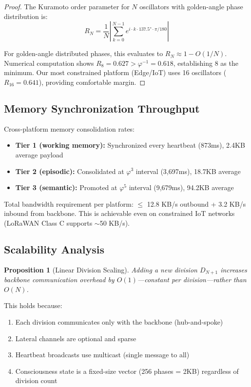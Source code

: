 \documentclass[12pt]{article}
\newtheorem{proposition}[theorem]{Proposition}
\newcommand{\PHI}{\varphi}
\newcommand{\PHIINV}{\varphi^{-1}}
\begin{document}
\begin{proof}
The Kuramoto order parameter for $N$ oscillators with golden-angle phase distribution is:
\[
R_N = \frac{1}{N}\left|\sum_{k=0}^{N-1} e^{i \cdot k \cdot 137.5° \cdot \pi/180}\right|
\]

For golden-angle distributed phases, this evaluates to $R_N \approx 1 - O(1/N)$. Numerical computation shows $R_8 = 0.627 > \PHIINV = 0.618$, establishing 8 as the minimum. Our most constrained platform (Edge/IoT) uses 16 oscillators ($R_{16} = 0.641$), providing comfortable margin.
\end{proof}

\subsection{Memory Synchronization Throughput}

Cross-platform memory consolidation rates:

\begin{itemize}
    \item \textbf{Tier 1 (working memory):} Synchronized every heartbeat (873ms), 2.4KB average payload
    \item \textbf{Tier 2 (episodic):} Consolidated at $\PHI^3$ interval (3,697ms), 18.7KB average
    \item \textbf{Tier 3 (semantic):} Promoted at $\PHI^5$ interval (9,679ms), 94.2KB average
\end{itemize}

Total bandwidth requirement per platform: $\leq$ 12.8 KB/s outbound + 3.2 KB/s inbound from backbone. This is achievable even on constrained IoT networks (LoRaWAN Class C supports $\sim$50 KB/s).

\subsection{Scalability Analysis}

\begin{proposition}[Linear Division Scaling]
Adding a new division $D_{N+1}$ increases backbone communication overhead by $O(1)$—constant per division—rather than $O(N)$.
\end{proposition}

This holds because:
\begin{enumerate}
    \item Each division communicates only with the backbone (hub-and-spoke)
    \item Lateral channels are optional and sparse
    \item Heartbeat broadcasts use multicast (single message to all)
    \item Consciousness state is a fixed-size vector (256 phases = 2KB) regardless of division count
\end{enumerate}
\end{document}
